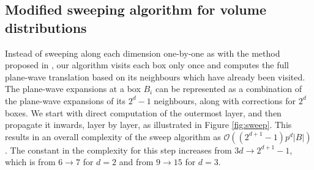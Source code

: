 
\subsection{Modified sweeping algorithm for volume distributions} 
\label{sec:sweep}
Instead of sweeping along each dimension one-by-one as with the method proposed 
in \cite{fggt}, our algorithm visits each box only once and computes the full plane-wave
translation based on its neighbours which have already been visited. The
plane-wave expansions at a box $B_i$ can be represented as a combination of the
plane-wave expansions of its $2^{d} -1$ neighbours, along with corrections for
$2^d$ boxes. We start with direct computation of the outermost layer, and then propagate it inwards, layer by layer, as illustrated in Figure \ref{fig:sweep}. This results in an overall complexity of the sweep algorithm as $\mathcal{O}((2^{d+1} -1)p^d|B|)$. The constant in the
complexity for this step increases from $3d\rightarrow2^{d+1} - 1$, which is
from $6\rightarrow7$ for $d=2$ and from $9\rightarrow15$ for $d=3$. 

